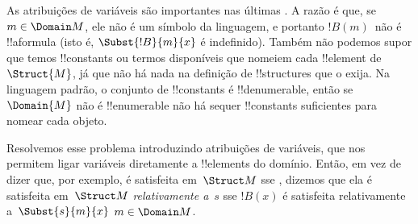 \documentclass[../../../include/open-logic-section]{subfiles}
\begin{document}
\begin{explain}
As atribuições de variáveis são importantes nas últimas
. A razão é que, se $m \in
\Domain M$, ele não é um símbolo da linguagem, e portanto $!B(m)$~não é
!!a{formula} (isto é, $\Subst{!B}{m}{x}$ é indefinido).  Também não
podemos supor que temos !!{constant}s ou termos disponíveis que nomeiem
cada !!{element} de~$\Struct{M}$, já que não há nada na
definição de !!{structure}s que o exija.  Na linguagem padrão,
o conjunto de !!{constant}s é !!{denumerable}, então se
$\Domain{M}$ não é !!{enumerable} não há sequer !!{constant}s
suficientes para nomear cada objeto.

Resolvemos esse problema introduzindo atribuições de variáveis, que
nos permitem ligar variáveis diretamente a !!{element}s do domínio.
Então, em vez de dizer que, por exemplo,
 é satisfeita
em~$\Struct M$ sse , dizemos que ela
é satisfeita em~$\Struct M$ \emph{relativamente a}~$s$ sse $!B(x)$ é
satisfeita relativamente a~$\Subst{s}{m}{x}$  $m \in \Domain M$.
\end{explain}
\end{document}
